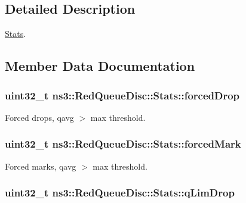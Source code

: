 \subsection{Detailed Description}
\hyperlink{structns3_1_1RedQueueDisc_1_1Stats}{Stats}. 

\subsection{Member Data Documentation}
\subsubsection[{\texorpdfstring{forced\+Drop}{forcedDrop}}]{\setlength{\rightskip}{0pt plus 5cm}uint32\+\_\+t ns3\+::\+Red\+Queue\+Disc\+::\+Stats\+::forced\+Drop}\hypertarget{structns3_1_1RedQueueDisc_1_1Stats_a56951fa215564c8d2e59aa046dc3e494}{}\label{structns3_1_1RedQueueDisc_1_1Stats_a56951fa215564c8d2e59aa046dc3e494}


Forced drops, qavg $>$ max threshold. 

\subsubsection[{\texorpdfstring{forced\+Mark}{forcedMark}}]{\setlength{\rightskip}{0pt plus 5cm}uint32\+\_\+t ns3\+::\+Red\+Queue\+Disc\+::\+Stats\+::forced\+Mark}\hypertarget{structns3_1_1RedQueueDisc_1_1Stats_a577b385784d9852f6557e6ec36fc9120}{}\label{structns3_1_1RedQueueDisc_1_1Stats_a577b385784d9852f6557e6ec36fc9120}


Forced marks, qavg $>$ max threshold. 

\subsubsection[{\texorpdfstring{q\+Lim\+Drop}{qLimDrop}}]{\setlength{\rightskip}{0pt plus 5cm}uint32\+\_\+t ns3\+::\+Red\+Queue\+Disc\+::\+Stats\+::q\+Lim\+Drop}\hypertarget{structns3_1_1RedQueueDisc_1_1Stats_a2374b8b8386ad6e42435bf1b29109bad}{}\label{structns3_1_1RedQueueDisc_1_1Stats_a2374b8b8386ad6e42435bf1b29109bad}


